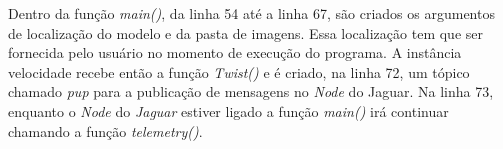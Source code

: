 Dentro da função \textit{main()}, da linha 54 até a linha 67, são criados os argumentos de localização do modelo e da pasta de imagens. Essa localização tem que ser fornecida pelo usuário no momento de execução do programa. A instância velocidade recebe então a função \textit{Twist()} e é criado, na linha 72, um tópico chamado \textit{pup} para a publicação de mensagens no \textit{Node} do Jaguar. Na linha 73, enquanto o \textit{Node} do \textit{Jaguar} estiver ligado a função \textit{main()} irá continuar chamando a função \textit{telemetry()}.
